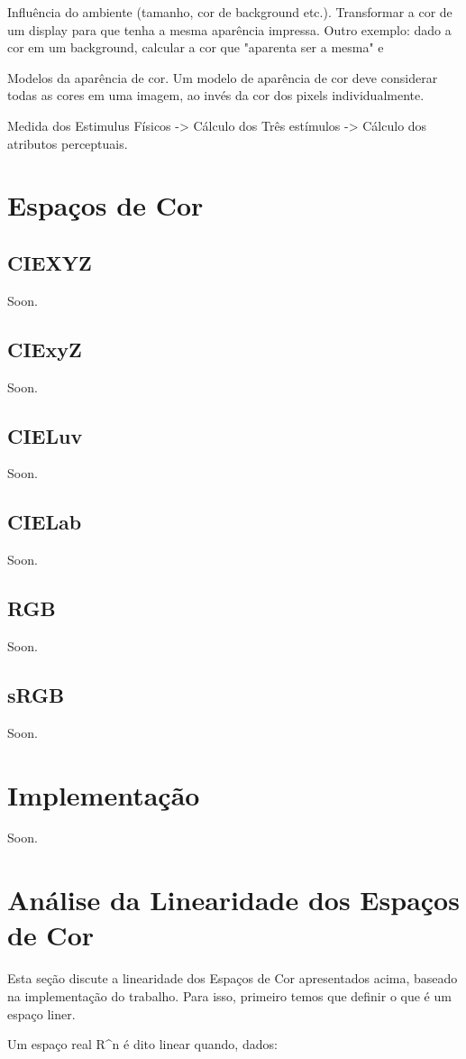 \documentclass[a4paper,10pt]{report}
\begin{document}
\par
Influência do ambiente (tamanho, cor de background etc.). Transformar a
cor de um display para que tenha a mesma aparência impressa. Outro exemplo:
dado a cor em um background, calcular a cor que "aparenta ser a mesma" e

\par
Modelos da aparência de cor. Um modelo de aparência de cor deve considerar
todas as cores em uma imagem, ao invés da cor dos pixels individualmente.

\par
Medida dos Estimulus Físicos -> Cálculo dos Três estímulos -> Cálculo dos
atributos perceptuais.

\section{Espaços de Cor}

\subsection{CIEXYZ}
Soon.

\subsection{CIExyZ}
Soon.

\subsection{CIELuv}
Soon.

\subsection{CIELab}
Soon.

\subsection{RGB}
Soon.

\subsection{sRGB}
Soon.

\section{Implementação}
Soon.

\section{Análise da Linearidade dos Espaços de Cor}
\par
Esta seção discute a linearidade dos Espaços de Cor apresentados acima, baseado
na implementação do trabalho. Para isso, primeiro temos que definir o que é um
espaço liner.
\par
Um espaço real R^n é dito linear quando, dados:
\end{document}
